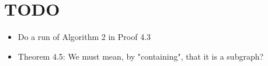 \section{TODO}\par
\begin{itemize}
  \item Do a run of Algorithm 2 in Proof 4.3
  \item Theorem 4.5: We must mean, by "containing", that it is a subgraph? 
\end{itemize}
